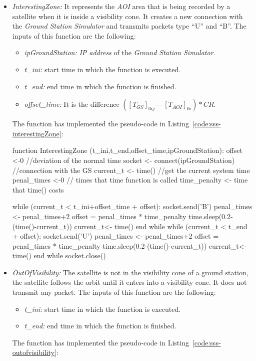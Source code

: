 \begin{itemize}
\item \emph{InterestingZone:} It represents the \emph{AOI} area that is being
  recorded by a satellite when it is inside a visibility cone. It creates a new
  connection with the \emph{Ground Station Simulator} and transmits packets type
  ``U'' and ``B''. The inputs of this function are the following:
\begin{itemize}
\item \emph{ipGroundStation:} \emph{IP address} of the \emph{Ground Station Simulator}.
\item \emph{t\_ini:} start time in which the function is executed.
\item \emph{t\_end:} end time in which the function is finished.
\item \emph{offset\_time:} It is the difference $([T_{GS}]_{0ij}- [T_{AOI}]_{0i} )*CR$.
\end{itemize}
The function has implemented the  pseudo-code in Listing~\ref{code:sss-interestingZone}:
\begin{listing}[
  float=h!,
  caption  = {Pseudocode of \emph{InterestingZone} function},
  label    = code:sss-interestingZone,
  style=customc]
function InterestingZone (t_ini,t_end,offset_time,ipGroundStation):
offset <-0 //deviation of the normal time
socket <- connect(ipGroundStation) //connection with the GS
current_t <- time() //get the current system time
penal_times <-0 // times that time function is called
time_penalty <- time that time() costs

while (current_t <  t_ini+offset_time + offset):
	socket.send('B')
	penal_times <- penal_times+2
	offset = penal_times * time_penalty
	time.sleep(0.2-(time()-current_t))
current_t<- time()
end while
while (current_t <  t_end + offset):
	socket.send('U')
	penal_times <- penal_times+2
	offset = penal_times * time_penalty
	time.sleep(0.2-(time()-current_t))
current_t<- time()
end while
socket.close()
\end{listing}

\item \emph{OutOfVisibility:} The satellite is not in the visibility cone of a
  ground station, the satellite follows the orbit until it enters into a
  visibility cone. It does not transmit any packet. The inputs of this function
  are the following:
\begin{itemize}
\item \emph{t\_ini:} start time in which the function is executed.
\item \emph{t\_end:} end time in which the function is finished.
\end{itemize}
The function has implemented the pseudo-code in Listing~\ref{code:sss-outofvisibility}:


\end{itemize}
